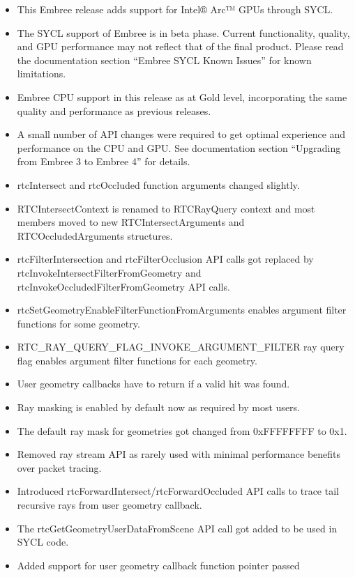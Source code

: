 \begin{itemize}
\tightlist
\item
  This Embree release adds support for Intel® Arc™ GPUs through SYCL.
\item
  The SYCL support of Embree is in beta phase. Current functionality,
  quality, and GPU performance may not reflect that of the final
  product. Please read the documentation section ``Embree SYCL Known
  Issues'' for known limitations.
\item
  Embree CPU support in this release as at Gold level, incorporating the
  same quality and performance as previous releases.
\item
  A small number of API changes were required to get optimal experience
  and performance on the CPU and GPU. See documentation section
  ``Upgrading from Embree 3 to Embree 4'' for details.
\item
  rtcIntersect and rtcOccluded function arguments changed slightly.
\item
  RTCIntersectContext is renamed to RTCRayQuery context and most members
  moved to new RTCIntersectArguments and RTCOccludedArguments
  structures.
\item
  rtcFilterIntersection and rtcFilterOcclusion API calls got replaced by
  rtcInvokeIntersectFilterFromGeometry and
  rtcInvokeOccludedFilterFromGeometry API calls.
\item
  rtcSetGeometryEnableFilterFunctionFromArguments enables argument
  filter functions for some geometry.
\item
  RTC\_RAY\_QUERY\_FLAG\_INVOKE\_ARGUMENT\_FILTER ray query flag enables
  argument filter functions for each geometry.
\item
  User geometry callbacks have to return if a valid hit was found.
\item
  Ray masking is enabled by default now as required by most users.
\item
  The default ray mask for geometries got changed from 0xFFFFFFFF to
  0x1.
\item
  Removed ray stream API as rarely used with minimal performance
  benefits over packet tracing.
\item
  Introduced rtcForwardIntersect/rtcForwardOccluded API calls to trace
  tail recursive rays from user geometry callback.
\item
  The rtcGetGeometryUserDataFromScene API call got added to be used in
  SYCL code.
\item
  Added support for user geometry callback function pointer passed

\end{itemize}
